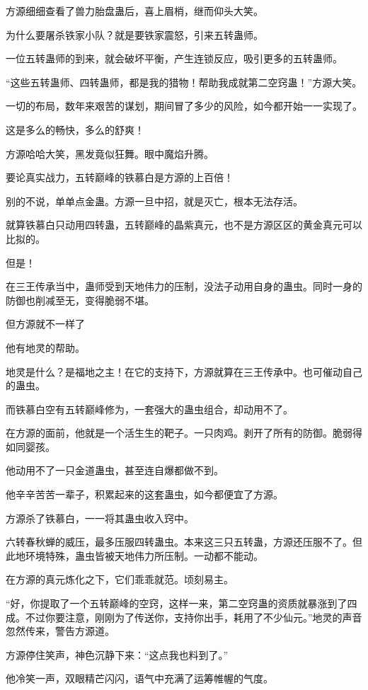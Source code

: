 \begin{this_body}
方源细细查看了兽力胎盘蛊后，喜上眉梢，继而仰头大笑。

为什么要屠杀铁家小队？就是要铁家震怒，引来五转蛊师。

一位五转蛊师的到来，就会破坏平衡，产生连锁反应，吸引更多的五转蛊师。

“这些五转蛊师、四转蛊师，都是我的猎物！帮助我成就第二空窍蛊！”方源大笑。

一切的布局，数年来艰苦的谋划，期间冒了多少的风险，如今都开始一一实现了。

这是多么的畅快，多么的舒爽！

方源哈哈大笑，黑发竟似狂舞。眼中魔焰升腾。

要论真实战力，五转巅峰的铁慕白是方源的上百倍！

别的不说，单单点金蛊。方源一旦中招，就是灭亡，根本无法存活。

就算铁慕白只动用四转蛊，五转巅峰的晶紫真元，也不是方源区区的黄金真元可以比拟的。

但是！

在三王传承当中，蛊师受到天地伟力的压制，没法子动用自身的蛊虫。同时一身的防御也削减至无，变得脆弱不堪。

但方源就不一样了

他有地灵的帮助。

地灵是什么？是福地之主！在它的支持下，方源就算在三王传承中。也可催动自己的蛊虫。

而铁慕白空有五转巅峰修为，一套强大的蛊虫组合，却动用不了。

在方源的面前，他就是一个活生生的靶子。一只肉鸡。剥开了所有的防御。脆弱得如同婴孩。

他动用不了一只金道蛊虫，甚至连自爆都做不到。

他辛辛苦苦一辈子，积累起来的这套蛊虫，如今都便宜了方源。

方源杀了铁慕白，一一将其蛊虫收入窍中。

六转春秋蝉的威压，最多压服四转蛊虫。本来这三只五转蛊，方源还压服不了。但此地环境特殊，蛊虫皆被天地伟力所压制。一动都不能动。

在方源的真元炼化之下，它们乖乖就范。顷刻易主。

“好，你提取了一个五转巅峰的空窍，这样一来，第二空窍蛊的资质就暴涨到了四成。不过你要注意，刚刚为了传送你，支持你出手，耗用了不少仙元。”地灵的声音忽然传来，警告方源道。

方源停住笑声，神色沉静下来：“这点我也料到了。”

他冷笑一声，双眼精芒闪闪，语气中充满了运筹帷幄的气度。


\end{this_body}
